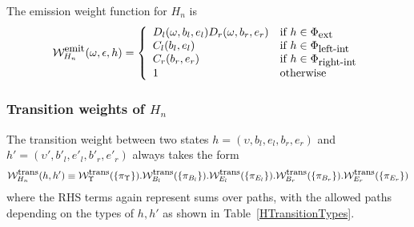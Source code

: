 \documentclass{article}
\newcommand\idfork{\Upsilon}
\newcommand\States{\Phi}
\newcommand\statesof[1]{\States_{#1}}
\newcommand\weight{{\cal W}}
\newcommand\weightfunof[1]{\weight_{#1}}
\newcommand\transweightfun[1]{\weightfunof{#1}^{\mbox{\small trans}}}
\newcommand\emitweightfun[1]{\weightfunof{#1}^{\mbox{\small emit}}}
\newcommand\sumoverpaths[1]{\transweightfun{#1}(\{\pi_{#1}\})}
\newcommand\stateset[1]{\statesof{\mbox{\small #1}}}
\newcommand\hstate{(\upsilon,b_l,e_l,b_r,e_r)}
\newcommand\hstatedest{(\upsilon',b'_l,e'_l,b'_r,e'_r)}
\newcommand\externalsuffix{ext}
\newcommand\leftsuffix{left-int}
\newcommand\rightsuffix{right-int}
\newcommand\externalcascades{\stateset{\externalsuffix}}
\newcommand\leftcascades{\stateset{\leftsuffix}}
\newcommand\rightcascades{\stateset{\rightsuffix}}
\begin{document}
The emission weight function for $H_n$ is
\[
\emitweightfun{H_n}(\omega,\epsilon,h) = \left\{
\begin{array}{ll}
D_l(\omega,b_l,e_l) D_r(\omega,b_r,e_r)
 & \mbox{if $h \in \externalcascades$} \\
C_l(b_l,e_l)
 & \mbox{if $h \in \leftcascades$} \\
C_r(b_r,e_r)
 & \mbox{if $h \in \rightcascades$} \\
1
 & \mbox{otherwise}
\end{array}
\right.
\]

\subsubsection{Transition weights of $H_n$}

The transition weight between two states
$h=\hstate$ and
$h'=\hstatedest$
always takes the form
\[
\transweightfun{H_n}(h,h') \equiv \sumoverpaths{\idfork} . \sumoverpaths{B_l} . \sumoverpaths{E_l} . \sumoverpaths{B_r} . \sumoverpaths{E_r}
\]
where the RHS terms again represent sums over paths, with the allowed paths depending on the types of $h,h'$ as shown in Table~\ref{HTransitionTypes}.
\end{document}
